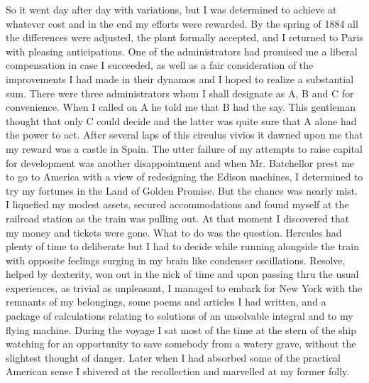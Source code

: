 \documentclass[a4paper,12pt,english,twoside,openright]{memoir}
\begin{document}
So it went day after day with variations, but I was determined to achieve at whatever cost and in 
the end my efforts were rewarded.  By the spring of 1884 all the differences were adjusted, the 
plant formally accepted, and I returned to Paris with pleasing anticipations.  One of the 
administrators had promised me a liberal compensation in case I succeeded, as well as a fair 
consideration of the improvements I had made in their dynamos and I hoped to realize a 
substantial sum.  There were three administrators whom I shall designate as A, B and C for 
convenience.  When I called on A he told me that B had the say.  This gentleman thought that 
only C could decide and the latter was quite sure that A alone had the power to act.  After several 
laps of this circulus vivios it dawned upon me that my reward was a castle in Spain.  The utter 
failure of my attempts to raise capital for development was another disappointment
and when Mr. 
Batchellor prest me to go to America with a view of redesigning the Edison machines, I 
determined to try my fortunes in the Land of Golden Promise.  But the chance was nearly mist.  I 
liquefied my modest assets, secured accommodations and found myself at the railroad station as 
the train was pulling out.  At that moment I discovered that my money and tickets were gone.  
What to do was the question.  Hercules had plenty of time to deliberate but I had to decide while 
running alongside the train with opposite feelings surging in my brain like condenser oscillations.  
Resolve, helped by dexterity, won out in the nick of time and upon passing thru the usual 
experiences, as trivial as unpleasant, I managed to embark for New York with the remnants of my 
belongings, some poems and articles I had written, and a package of calculations relating to 
solutions of an unsolvable integral and to my flying machine.  During the voyage I sat most of the 
time at the stern of the ship watching for an opportunity to save somebody from a watery grave, 
without the slightest thought of danger.  Later when I had absorbed some of the practical 
American sense I shivered at the recollection and marvelled at my former folly.  

\vspace{-1em}
\end{document}
